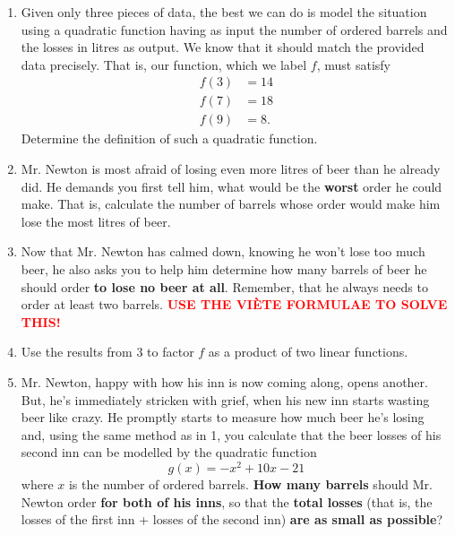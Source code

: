 \documentclass[a4paper,11pt]{article}
\newcommand{\tr}{\textcolor{red}}
\begin{document}
\begin{enumerate}
 \item Given only three pieces of data, the best we can do is model the
  situation using a quadratic function having as input the number of ordered
  barrels and the losses in litres as output. We know that it should match the
  provided data precisely. That is, our function, which we label $f$, must
  satisfy
  \begin{equation*}
   \begin{split}
    f(3) &= 14 \\
    f(7) &= 18 \\
    f(9) &= 8.
   \end{split}
  \end{equation*}
  Determine the definition of such a quadratic function.
 \item Mr. Newton is most afraid of losing even more litres of beer than he
  already did. He demands you first tell him, what would be the \textbf{worst}
  order he could make. That is, calculate the number of barrels whose order would make
  him lose the most litres of beer.
 \item Now that Mr. Newton has calmed down, knowing he won't lose too much beer,
  he also asks you to help him determine how many barrels of beer he should
  order \textbf{to lose no beer at all}. Remember, that he always needs to order
  at least two barrels. \textbf{\uppercase{\tr{Use the Viète formulae to solve
  this!}}}
 \item Use the results from 3 to factor $f$ as a product of two linear
  functions.
 \item Mr. Newton, happy with how his inn is now coming along, opens another.
  But, he's immediately stricken with grief, when his new inn starts wasting
  beer like crazy. He promptly starts to measure how much beer he's losing and,
  using the same method as in 1, you calculate that the beer losses of his
  second inn can be modelled by the quadratic function
  \[
   g(x) = -x^2 + 10x - 21
  \]
  where $x$ is the number of ordered barrels. \textbf{How many barrels} should
  Mr. Newton order \textbf{for both of his inns}, so that the \textbf{total
  losses} (that is, the losses of the first inn + losses of the second inn)
  \textbf{are as small as possible}?
\end{enumerate}
\end{document}
